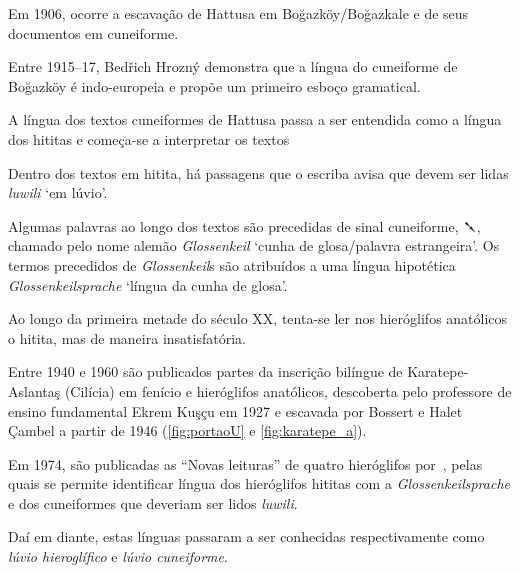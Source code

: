 \documentclass[article]{lúvio}
\begin{document}
\begin{compactitem}
	\item Em 1906, ocorre a escavação de Hattusa em Boğazköy/Boğazkale e de seus
	documentos em cuneiforme.
	\item Entre 1915--17, Bedřich Hrozný demonstra que a língua do cuneiforme de
	Boğazköy é indo-europeia e propõe um primeiro esboço gramatical.
	\item A língua dos textos cuneiformes de Hattusa passa a ser entendida como a
	língua dos hititas e começa-se a interpretar os textos
	\item Dentro dos textos em hitita, há passagens que o escriba avisa que devem
	ser lidas \emph{luwili} `em lúvio'.
	\item Algumas palavras ao longo dos textos são precedidas de sinal cuneiforme,
	\foreignlanguage{hittite}{𒃵}, chamado pelo nome alemão \emph{Glossenkeil}
	`cunha de glosa/palavra estrangeira'. Os termos precedidos de
	\emph{Glossenkeil}s são atribuídos a uma língua hipotética
	\emph{Glossenkeilsprache} `língua da cunha de glosa'.
	\item Ao longo da primeira metade do século XX, tenta-se ler nos hieróglifos
	anatólicos o hitita, mas de maneira insatisfatória.
	\item Entre 1940 e 1960 são publicados partes da inscrição bilíngue de
	Karatepe\hyp{}Aslantaş (Cilícia) em fenício e hieróglifos anatólicos, descoberta
	pelo professore de ensino fundamental Ekrem Kuşçu em 1927 e escavada por Bossert e
	Halet Çambel a partir de 1946 (\autoref{fig:portaoU} e
	\autoref{fig:karatepe_a}).
	\item Em 1974, são publicadas as ``Novas leituras'' de quatro hieróglifos
	por~\textcite{HawkinsMorpurgoNeumann1974}, pelas quais se permite identificar
	língua dos hieróglifos hititas com a
	\emph{\foreignlanguage{german}{Glossenkeilsprache}} e dos cuneiformes que deveriam
	ser lidos \emph{luwili}.
	\item Daí em diante, estas línguas passaram a ser conhecidas respectivamente como
	\emph{lúvio hieroglífico} e \emph{lúvio cuneiforme}.
\end{compactitem}
\end{document}
